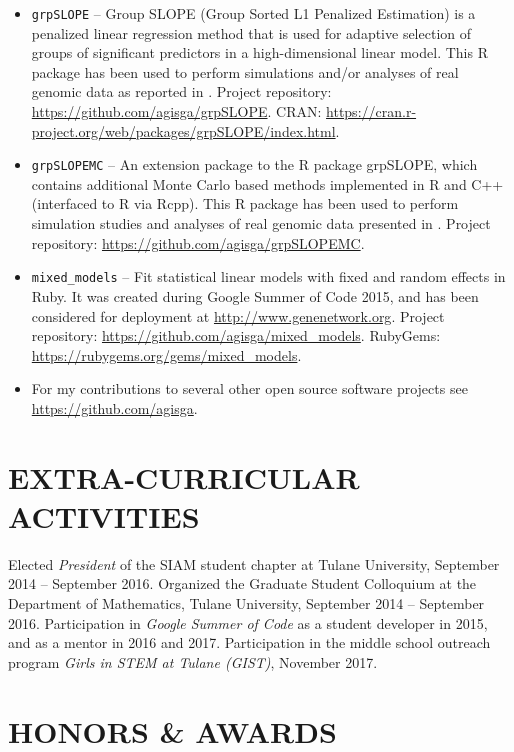 \documentclass[overlapped, line, 10pt]{res} %
\begin{document}
\begin{resume}
\begin{itemize} \itemsep -2pt %
  \item \verb!grpSLOPE! -- Group SLOPE (Group Sorted L1 Penalized Estimation) is a penalized linear regression method that is used for adaptive selection of groups of significant predictors in a high-dimensional linear model. This R package has been used to perform simulations and/or analyses of real genomic data as reported in \cite{Gossmann2017-yu, brzyski2016}. Project repository: \url{https://github.com/agisga/grpSLOPE}. CRAN: \url{https://cran.r-project.org/web/packages/grpSLOPE/index.html}.
  \item \verb!grpSLOPEMC! -- An extension package to the R package grpSLOPE, which contains additional Monte Carlo based methods implemented in R and C++ (interfaced to R via Rcpp). This R package has been used to perform simulation studies and analyses of real genomic data presented in \cite{Gossmann2017-yu}. Project repository: \url{https://github.com/agisga/grpSLOPEMC}.
  \item \verb!mixed_models! -- Fit statistical linear models with fixed and random effects in Ruby. It was created during Google Summer of Code 2015, and has been considered for deployment at \url{http://www.genenetwork.org}. Project repository: \url{https://github.com/agisga/mixed_models}. RubyGems: \url{https://rubygems.org/gems/mixed_models}.
  \item For my contributions to several other open source software projects see \url{https://github.com/agisga}.
\end{itemize}


\section{EXTRA-CURRICULAR ACTIVITIES}

Elected {\it President} of the SIAM student chapter at Tulane University, September 2014 -- September 2016.
Organized the Graduate Student Colloquium at the Department of Mathematics, Tulane University, September 2014 -- September 2016.
Participation in \emph{Google Summer of Code} as a student developer in 2015, and as a mentor in 2016 and 2017.
Participation in the middle school outreach program \emph{Girls in STEM at Tulane (GIST)}, November 2017.


\section{HONORS \& AWARDS}


\end{resume}
\end{document}
